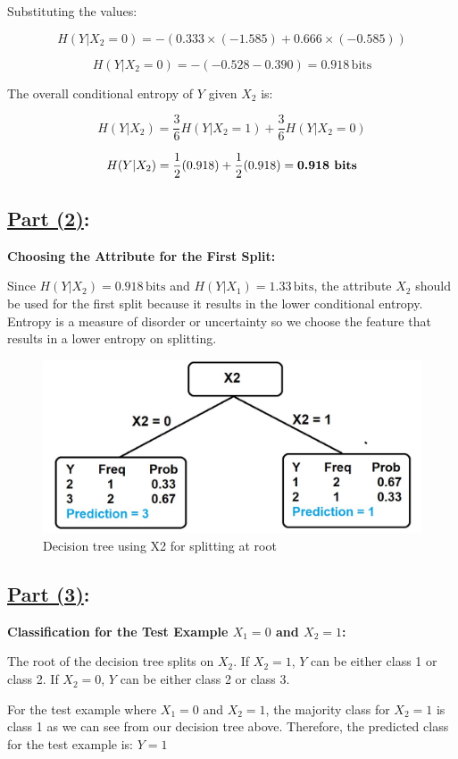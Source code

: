 \documentclass[12pt]{article}
\begin{document}
Substituting the values:

\[
  H(Y|X_2 = 0) = -\left( 0.333 \times (-1.585) + 0.666 \times (-0.585) \right)
\]

\[
  H(Y|X_2 = 0) = -( -0.528 - 0.390 ) = 0.918 \, \text{bits}
\]

The overall conditional entropy of \( Y \) given \( X_2 \) is:

\[
  H(Y|X_2) = \frac{3}{6} H(Y|X_2 = 1) + \frac{3}{6} H(Y|X_2 = 0)
\]

\[
  H(Y|X_2) = \frac{1}{2}(0.918) + \frac{1}{2}(0.918) = \textbf{0.918 \text{bits}}
\]

\subsection*{\underline{Part (2)}:}
\textbf{Choosing the Attribute for the First Split:}

Since \( H(Y|X_2) = 0.918 \, \text{bits} \) and \( H(Y|X_1) = 1.33 \, \text{bits} \), the attribute $X_2$ should be used for the first split because it results in the lower conditional entropy. Entropy is a measure of disorder or uncertainty so we choose the feature that results in a lower entropy on splitting.

\begin{figure}[h!] %
  \centering %
  \includegraphics[width=\textwidth]{tree_image.jpeg} %
  \caption{Decision tree using X2 for splitting at root} %
  \label{fig:your_label_2} %
\end{figure}

\subsection*{\underline{Part (3)}:}
\textbf{Classification for the Test Example $X_1 = 0$ and $X_2 = 1$:}

The root of the decision tree splits on $X_2$. If $X_2 = 1$, $Y$ can be either class 1 or class 2. If $X_2 = 0$, $Y$ can be either class 2 or class 3.

For the test example where $X_1 = 0$ and $X_2 = 1$, the majority class for $X_2 = 1$ is class 1 as we can see from our decision tree above. Therefore, the predicted class for the test example is: \(\boxed{Y = 1}\)
\end{document}
